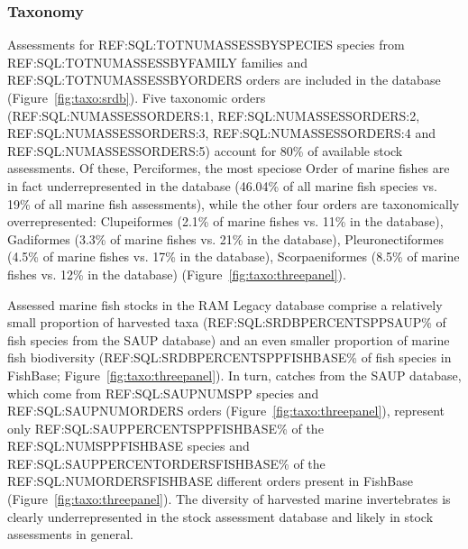 
\subsubsection*{Taxonomy}

Assessments for REF:SQL:TOTNUMASSESSBYSPECIES species from
REF:SQL:TOTNUMASSESSBYFAMILY families and REF:SQL:TOTNUMASSESSBYORDERS
orders are included in the database (Figure~\ref{fig:taxo:srdb}). Five
taxonomic orders (REF:SQL:NUMASSESSORDERS:1,
REF:SQL:NUMASSESSORDERS:2, REF:SQL:NUMASSESSORDERS:3,
REF:SQL:NUMASSESSORDERS:4 and REF:SQL:NUMASSESSORDERS:5) account for
80\% of available stock assessments.  Of these, Perciformes, the most
speciose Order of marine fishes are in fact underrepresented in the
database (46.04\% of all marine fish species vs.  19\% of all marine
fish assessments), while the other four orders are
taxonomically overrepresented: Clupeiformes (2.1\% of marine fishes
vs.  11\% in the database), Gadiformes (3.3\% of marine fishes vs.
21\% in the database), Pleuronectiformes (4.5\% of marine fishes vs.
17\% in the database), Scorpaeniformes (8.5\% of marine fishes vs.
12\% in the database) (Figure~\ref{fig:taxo:threepanel}).

Assessed marine fish stocks in the RAM Legacy database comprise a
relatively small proportion of harvested taxa
(REF:SQL:SRDBPERCENTSPPSAUP\% of fish species from the SAUP database)
and an even smaller proportion of marine fish biodiversity
(REF:SQL:SRDBPERCENTSPPFISHBASE\% of fish species in FishBase;
Figure~\ref{fig:taxo:threepanel}). In turn, catches from the SAUP
database, which come from REF:SQL:SAUPNUMSPP species and
REF:SQL:SAUPNUMORDERS orders (Figure~\ref{fig:taxo:threepanel}),
represent only REF:SQL:SAUPPERCENTSPPFISHBASE\% of the
REF:SQL:NUMSPPFISHBASE species and REF:SQL:SAUPPERCENTORDERSFISHBASE\%
of the REF:SQL:NUMORDERSFISHBASE different orders present in FishBase
(Figure~\ref{fig:taxo:threepanel}). The diversity of harvested marine
invertebrates is clearly underrepresented in the stock assessment
database and likely in stock assessments in general.


